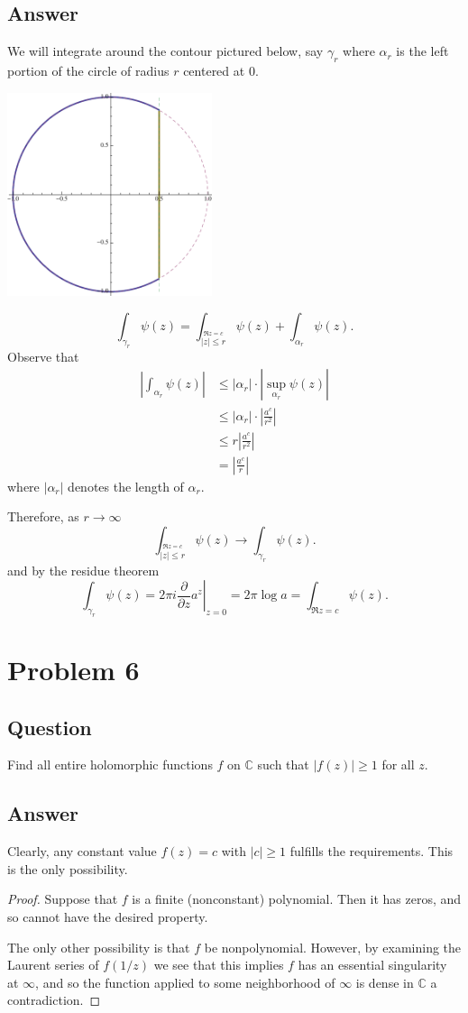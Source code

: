 \documentclass[11pt]{article}
\begin{document}
\subsection{Answer}We will integrate around the contour pictured below, say $\gamma_r$ where $\alpha_r$ is the left portion of the circle of radius $r$ centered at 0.
\begin{center}\includegraphics[width=60mm]{contour.pdf}\end{center}
\[\int_{\gamma_r} \psi(z) = \int_{\stackrel{\Re z = c}{|z|\leq r}} \psi(z) + \int_{\alpha_r} \psi(z).\]  
Observe that 
\begin{align*} \left| \int_{\alpha_r} \psi(z) \right| & \leq |\alpha_r| \cdot | \sup_{\alpha_r} \psi(z)|\\
& \leq |\alpha_r| \cdot | \frac{a^c}{r^2}|\\
& \leq r | \frac{a^c}{r^2}|\\
&= | \frac{a^c}{r}|
\end{align*}
where $|\alpha_r|$ denotes the length of $\alpha_r$.

Therefore, as $ r \to \infty$ 
\[  \int_{\stackrel{\Re z = c}{|z|\leq r}} \psi(z) \to \int_{\gamma_r} \psi(z) .\]  
and by the residue theorem 
\[ \int_{\gamma_r} \psi(z) =\left. 2 \pi i \frac{\partial}{\partial z} a^z \right|_{z=0} =2 \pi \log{a} =  \int_{\Re z = c} \psi(z) .\]

\section{Problem 6}
\subsection{Question}
Find all entire holomorphic functions $f$ on $\mathbb{C}$ such that $ |f(z)| \geq 1$ for all $z$. 
\subsection{Answer}
Clearly, any constant value $f(z) = c$ with $|c| \geq 1$ fulfills the requirements. This is the only possibility.
\begin{proof}
Suppose that $f $ is a finite (nonconstant) polynomial. Then it has zeros, and so cannot have the desired property. 

The only other possibility is that $f$ be nonpolynomial. However, by examining the Laurent series of $f(1/z)$ we see that this  implies $f$ has an essential singularity at $\infty$, and so the function applied to some neighborhood of $\infty$ is dense in $\mathbb{C}$ a contradiction.
\end{proof}
\end{document}
